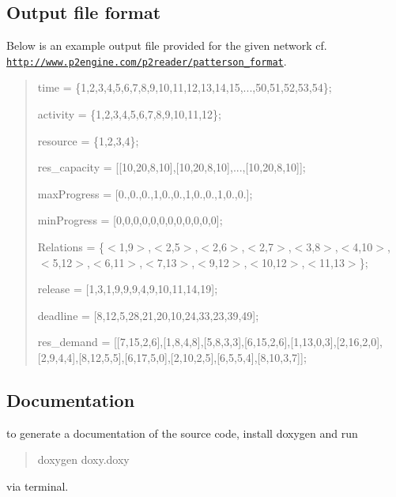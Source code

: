 \subsection*{Output file format }

Below is an example output file provided for the given network cf. \href{http://www.p2engine.com/p2reader/patterson_format}{\tt http\+://www.\+p2engine.\+com/p2reader/patterson\+\_\+format}. \begin{quote}
time = \{1,2,3,4,5,6,7,8,9,10,11,12,13,14,15,...,50,51,52,53,54\};

activity = \{1,2,3,4,5,6,7,8,9,10,11,12\};

resource = \{1,2,3,4\};

res\+\_\+capacity = \mbox{[}\mbox{[}10,20,8,10\mbox{]},\mbox{[}10,20,8,10\mbox{]},...,\mbox{[}10,20,8,10\mbox{]}\mbox{]};

max\+Progress = \mbox{[}0.,0.,0.,1,0.,0.,1,0.,0.,1,0.,0.\mbox{]};

min\+Progress = \mbox{[}0,0,0,0,0,0,0,0,0,0,0,0\mbox{]};

Relations = \{$<$1,9$>$,$<$2,5$>$,$<$2,6$>$,$<$2,7$>$,$<$3,8$>$,$<$4,10$>$,$<$5,12$>$,$<$6,11$>$,$<$7,13$>$,$<$9,12$>$,$<$10,12$>$,$<$11,13$>$\};

release = \mbox{[}1,3,1,9,9,9,4,9,10,11,14,19\mbox{]};

deadline = \mbox{[}8,12,5,28,21,20,10,24,33,23,39,49\mbox{]};

res\+\_\+demand = \mbox{[}\mbox{[}7,15,2,6\mbox{]},\mbox{[}1,8,4,8\mbox{]},\mbox{[}5,8,3,3\mbox{]},\mbox{[}6,15,2,6\mbox{]},\mbox{[}1,13,0,3\mbox{]},\mbox{[}2,16,2,0\mbox{]},\mbox{[}2,9,4,4\mbox{]},\mbox{[}8,12,5,5\mbox{]},\mbox{[}6,17,5,0\mbox{]},\mbox{[}2,10,2,5\mbox{]},\mbox{[}6,5,5,4\mbox{]},\mbox{[}8,10,3,7\mbox{]}\mbox{]}; \end{quote}


\subsection*{Documentation }

to generate a documentation of the source code, install doxygen and run \begin{quote}
doxygen doxy.\+doxy \end{quote}
via terminal. 